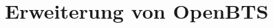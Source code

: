 \documentclass[a4paper,11pt,oneside]{scrartcl}
\begin{document}
\raggedbottom






\section{Erweiterung von OpenBTS}\label{sec:erweiterung}







\end{document}
